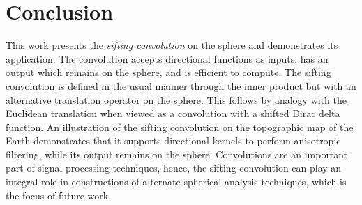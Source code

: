 \section{Conclusion}\label{sec:chapter2_conclusion}

This work presents the \emph{sifting convolution} on the sphere and demonstrates its application.
The convolution accepts directional functions as inputs, has an output which remains on the sphere, and is efficient to compute.
The sifting convolution is defined in the usual manner through the inner product but with an alternative translation operator on the sphere.
This follows by analogy with the Euclidean translation when viewed as a convolution with a shifted Dirac delta function.
An illustration of the sifting convolution on the topographic map of the Earth demonstrates that it supports directional kernels to perform anisotropic filtering, while its output remains on the sphere.
Convolutions are an important part of signal processing techniques, hence, the sifting convolution can play an integral role in constructions of alternate spherical analysis techniques, which is the focus of future work.
